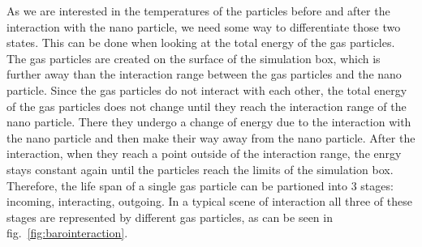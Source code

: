 \documentclass[12pt]{article}
\begin{document}
As we are interested in the temperatures of the particles before and after the interaction with the nano particle, we need some way to differentiate those
two states. This can be done when looking at the total energy of the gas particles.\\
The gas particles are created on the surface of the simulation box, which is further away than the interaction range between the gas particles and the
nano particle. Since the gas particles do not interact with each other, the total energy of the gas particles does not change until they reach the
interaction range of the nano particle. There they undergo a change of energy due to the interaction with the nano particle and then make their way away
from the nano particle. After the interaction, when they reach a point outside of the interaction range, the enrgy stays constant again until the
particles reach the limits of the simulation box.\\
Therefore, the life span of a single gas particle can be partioned into 3 stages: incoming, interacting, outgoing. In a typical scene of interaction
all three of these stages are represented by different gas particles, as can be seen in fig.~\ref{fig:barointeraction}.\\
\end{document}
